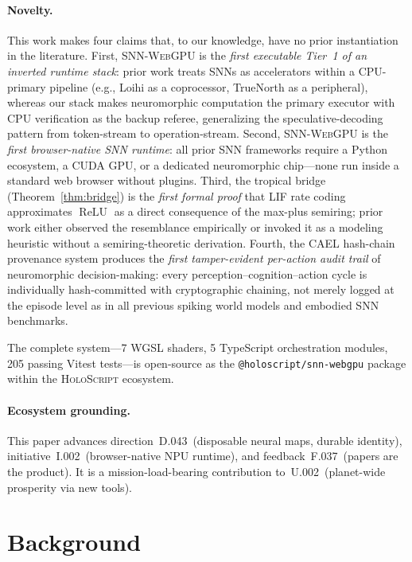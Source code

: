 \documentclass[10pt]{article}
\newcommand{\snnwebgpu}{\textsc{SNN-WebGPU}}
\newcommand{\holoscript}{\textsc{HoloScript}}
\newcommand{\cael}{\textsc{CAEL}}
\newcommand{\relu}{\operatorname{ReLU}}
\begin{document}
\paragraph{Novelty.}
This work makes four claims that, to our knowledge, have no prior instantiation
in the literature.
First, \snnwebgpu{} is the \emph{first executable Tier~1 of an inverted
runtime stack}: prior work treats SNNs as accelerators within a CPU-primary
pipeline (e.g., Loihi as a coprocessor, TrueNorth as a peripheral), whereas
our stack makes neuromorphic computation the primary executor with CPU
verification as the backup referee, generalizing the speculative-decoding
pattern from token-stream to operation-stream.
Second, \snnwebgpu{} is the \emph{first browser-native SNN runtime}: all
prior SNN frameworks require a Python ecosystem, a CUDA GPU, or a dedicated
neuromorphic chip---none run inside a standard web browser without plugins.
Third, the tropical bridge (Theorem~\ref{thm:bridge}) is the
\emph{first formal proof} that LIF rate coding approximates $\relu$ as a
direct consequence of the max-plus semiring; prior work either observed the
resemblance empirically or invoked it as a modeling heuristic without a
semiring-theoretic derivation.
Fourth, the \cael{} hash-chain provenance system produces the
\emph{first tamper-evident per-action audit trail} of neuromorphic
decision-making: every perception--cognition--action cycle is individually
hash-committed with cryptographic chaining, not merely logged at the episode
level as in all previous spiking world models and embodied SNN benchmarks.

The complete system---7 WGSL shaders, 5 TypeScript orchestration modules,
205 passing Vitest tests---is open-source as the \texttt{@holoscript/snn-webgpu} package
within the \holoscript{} ecosystem.


\paragraph{Ecosystem grounding.} This paper advances direction~D.043~(disposable neural maps, durable identity), initiative~I.002~(browser-native NPU runtime), and feedback~F.037~(papers are the product). It is a mission-load-bearing contribution to~U.002~(planet-wide prosperity via new tools).

\section{Background}
\label{sec:background}
\end{document}

